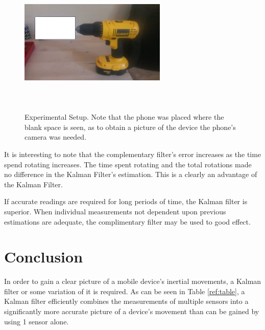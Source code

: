 \documentclass{acm_proc_article-sp}
\begin{document}
\begin{figure}[ht]
\includegraphics[width=70mm, height=70mm]{drill.jpg}
\caption{Experimental Setup.  Note that the phone was placed where the blank space is seen, as to obtain a picture of the device the phone's camera was needed.}
\label{fig:drill}
\end{figure}
 
It is interesting to note that the complementary filter's error increases as the time spend rotating increases.  The time spent rotating and the total rotations made no difference in the Kalman Filter's estimation.  This is a clearly an advantage of the Kalman Filter.

If accurate readings are required for long periods of time, the Kalman filter is superior.  When individual measurements not dependent upon previous estimations are adequate, the complimentary filter may be used to good effect.

\section{Conclusion}

In order to gain a clear picture of a mobile device's inertial movements, a Kalman filter or some variation of it is required.  As can be seen in Table \ref{ref:table}, a Kalman filter efficiently combines the measurements of multiple sensors into a significantly more accurate picture of a device's movement than can be gained by using 1 sensor alone.

\begin{appendices}

\end{appendices}



\end{document}
